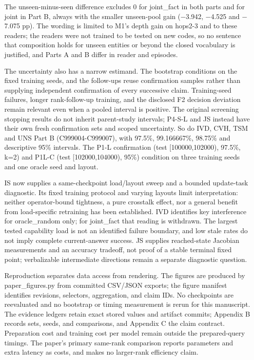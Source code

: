 The unseen-minus-seen difference excludes 0 for joint\_fact in both parts and for joint in
Part B, always with the smaller unseen-pool gain (\ensuremath{-}3.942, \ensuremath{-}4.525 and \ensuremath{-}7.075 pp).  %
The wording is limited to M1’s depth gain on hops2-3 and to these readers; the readers were not
trained to be tested on new codes, so no sentence that composition holds for unseen entities or
beyond the closed vocabulary is justified, and Parts A and B differ in reader and episodes.

The uncertainty also has a narrow estimand. The bootstrap conditions on the fixed
training seeds, and the follow-ups reuse confirmation samples rather than supplying
independent confirmation of every successive claim.  %
Training-seed failures, longer rank-follow-up training, and the disclosed F2 decision
deviation remain relevant even when a pooled interval is positive.  %
The original screening stopping results do not inherit parent-study intervals;
P4-S-L and JS instead have their own fresh confirmation sets and scoped uncertainty.
 So do IVD, CVH, TSM and UNS Part B  %
(C999004-C999007), with 97.5\%, 99.166667\%, 98.75\% and descriptive 95\% intervals.
 The P1-L confirmation (test [100000,102000), 97.5\%, k=2) and P1L-C  %
(test [102000,104000), 95\%) condition on three training seeds and one oracle seed and layout.  %

IS now supplies a same-checkpoint load/\allowbreak{}layout sweep and a bounded update-task
diagnostic. Its fixed training protocol and varying layouts  %
limit interpretation: neither operator-bound tightness, a pure crosstalk effect,
nor a general benefit from load-specific retraining has been established.
 IVD identifies key interference for oracle\_random only; for joint\_fact  %
that reading is withdrawn. The largest tested capability load is not an identified  %
failure boundary, and low stale rates do not imply complete current-answer success.
 JS supplies reached-state Jacobian measurements and an  %
accuracy tradeoff, not proof of a stable terminal fixed point; verbalizable
intermediate directions remain a separate diagnostic question.  %

Reproduction separates data access from rendering. The figures are produced by
paper\_figures.py from committed CSV/\allowbreak{}JSON exports;
the figure manifest identifies revisions, selectors,
aggregation, and claim IDs. No checkpoints are reevaluated and no bootstrap or
timing measurement is rerun for this manuscript. The evidence ledgers retain exact
stored values and artifact commits; Appendix B records sets, seeds, and comparisons, and
Appendix C the claim contract.
Preparation cost and training cost per model remain outside the prepared-query
timings. The paper’s primary same-rank comparison reports  %
parameters and extra latency as costs, and makes no larger-rank efficiency claim.

